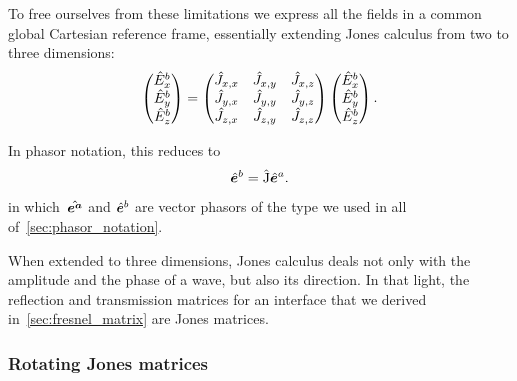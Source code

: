 To free ourselves from these limitations we express all the fields in a common global Cartesian reference frame, essentially extending Jones calculus from two to three dimensions:
\begin{equation}
    \begin{pmatrix}
        \hat{E}^b_x\\
        \hat{E}^b_y\\
        \hat{E}^b_z
    \end{pmatrix}
    =
    \begin{pmatrix}
        \hat{J}_{x, x}   &   \hat{J}_{x, y}   &   \hat{J}_{x, z} \\
        \hat{J}_{y, x}   &   \hat{J}_{y, y}   &   \hat{J}_{y, z} \\
        \hat{J}_{z, x}   &   \hat{J}_{z, y}   &   \hat{J}_{z, z}
    \end{pmatrix}
    \begin{pmatrix}
        \hat{E}^b_x\\
        \hat{E}^b_y\\
        \hat{E}^b_z
    \end{pmatrix}
    \text{.}
    \label{eq:jones_matrix_3d}
\end{equation}

\begin{samepage}
In phasor notation, this reduces to
\begin{equation}
    \hat{\bm{e}}^b = \hat{\mathrm{J}} \hat{\bm{e}}^a
    \text{.}
\end{equation}
in which~$\hat{\bm{e^a}}$ and $\hat{\bm{e}}^b$ are vector phasors of the type we used in all of~\cref{sec:phasor_notation}.
\end{samepage}

When extended to three dimensions, Jones calculus deals not only with the amplitude and the phase of a wave, but also its direction.
In that light, the reflection and transmission matrices for an interface that we derived in~\vref{sec:fresnel_matrix} are Jones matrices.



\subsubsection{Rotating Jones matrices}
\label{sec:rotating_jones_matrices}


